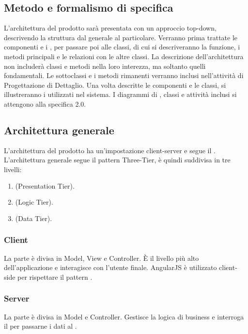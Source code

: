 \documentclass[a4paper, titlepage]{article}
\begin{document}
	\subsection{Metodo e formalismo di specifica}
	
	L'architettura del prodotto sarà presentata con un approccio top-down, descrivendo la struttura dal generale al particolare. Verranno prima trattate le componenti e i , per passare poi alle classi, di cui si descriveranno la funzione, i metodi principali e le relazioni con le altre classi. La descrizione dell'architettura non includerà classi e metodi nella loro interezza, ma soltanto quelli fondamentali. Le sottoclassi e i metodi rimanenti verranno inclusi nell'attività di Progettazione di Dettaglio.
	\newline
	Una volta descritte le componenti e le classi, si illustreranno i  utilizzati nel sistema. 
	\newline
	I diagrammi di , classi e attività inclusi si attengono alla specifica  2.0.
	
	\subsection{Architettura generale}
	L'architettura del prodotto ha un'impostazione client-server e segue il  . 
	\newline
	L'architettura generale segue il pattern Three-Tier, è quindi suddivisa in tre livelli:
	\begin{enumerate}
		\item {} (Presentation Tier).
		\item {} (Logic Tier).
		\item {} (Data Tier).
	\end{enumerate}
	
	\subsubsection{Client}
	La parte  è divisa in Model, View e Controller. È il livello più alto dell'applicazione e interagisce con l'utente finale.
	\newline
	AngularJS è utilizzato client-side per rispettare il pattern .
	
	\subsubsection{Server}
	La parte  è divisa in Model e Controller. Gestisce la logica di business e interroga il  per passarne i dati al .
	
\end{document}
